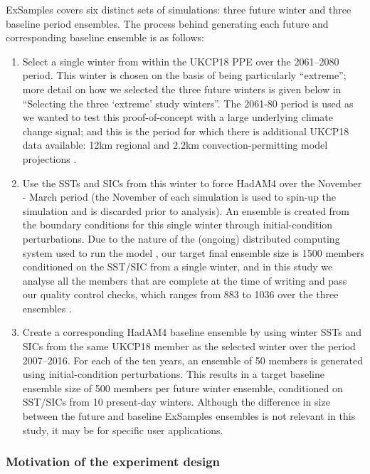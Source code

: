     ExSamples covers six distinct sets of simulations: three future winter and three baseline period ensembles. The process behind generating each future and corresponding baseline ensemble is as follows:

    \begin{enumerate}
      \item Select a single winter from within the UKCP18 PPE over the 2061--2080 period. This winter is chosen on the basis of being particularly ``extreme''; more detail on how we selected the three future winters is given below in ``Selecting the three `extreme' study winters''. The 2061-80 period is used as we wanted to test this proof-of-concept with a large underlying climate change signal; and this is the period for which there is additional UKCP18 data available: 12km regional and 2.2km convection-permitting model projections \citep{kendon_ukcp_2019,murphy_ukcp18_2018}.
      \item Use the SSTs and SICs from this winter to force HadAM4 over the November - March period (the November of each simulation is used to spin-up the simulation and is discarded prior to analysis). An ensemble is created from the boundary conditions for this single winter through initial-condition perturbations. Due to the nature of the (ongoing) distributed computing system used to run the model \citep{allen_-it-yourself_1999,stainforth_uncertainty_2005}, our target final ensemble size is 1500 members conditioned on the SST/SIC from a single winter, and in this study we analyse all the members that are complete at the time of writing and pass our quality control checks, which ranges from 883 to 1036 over the three ensembles \citep{sparrow_exsamples_2021}.
      \item Create a corresponding HadAM4 baseline ensemble by using winter SSTs and SICs from the same UKCP18 member as the selected winter over the period 2007--2016. For each of the ten years, an ensemble of 50 members is generated using initial-condition perturbations. This results in a target baseline ensemble size of 500 members per future winter ensemble, conditioned on SST/SICs from 10 present-day winters. Although the difference in size between the future and baseline ExSamples ensembles is not relevant in this study, it may be for specific user applications.
    \end{enumerate}
  
    \subsubsection{Motivation of the experiment design}

